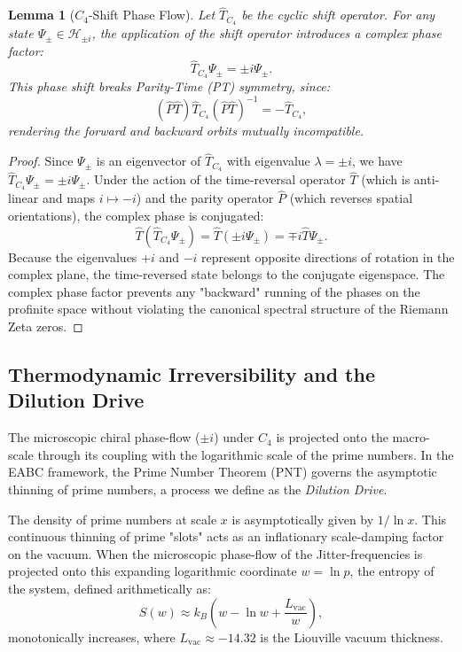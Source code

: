 \documentclass[11pt,a4paper]{article}
\newtheorem{lemma}[theorem]{Lemma}
\theoremstyle{definition}
\begin{document}
	\begin{lemma}[$C_4$-Shift Phase Flow]
		\label{lem:c4_shift}
		Let $\hat{T}_{C_4}$ be the cyclic shift operator. For any state $\Psi_{\pm} \in \mathcal{H}_{\pm i}$, the application of the shift operator introduces a complex phase factor:
		\begin{equation}
			\hat{T}_{C_4} \Psi_{\pm} = \pm i \Psi_{\pm}.
		\end{equation}
		This phase shift breaks Parity-Time (PT) symmetry, since:
		\begin{equation}
			(\hat{P}\hat{T}) \hat{T}_{C_4} (\hat{P}\hat{T})^{-1} = -\hat{T}_{C_4},
		\end{equation}
		rendering the forward and backward orbits mutually incompatible.
	\end{lemma}
	
	\begin{proof}
		Since $\Psi_{\pm}$ is an eigenvector of $\hat{T}_{C_4}$ with eigenvalue $\lambda = \pm i$, we have $\hat{T}_{C_4} \Psi_{\pm} = \pm i \Psi_{\pm}$. Under the action of the time-reversal operator $\hat{T}$ (which is anti-linear and maps $i \mapsto -i$) and the parity operator $\hat{P}$ (which reverses spatial orientations), the complex phase is conjugated:
		\begin{equation}
			\hat{T} (\hat{T}_{C_4} \Psi_{\pm}) = \hat{T} (\pm i \Psi_{\pm}) = \mp i \hat{T} \Psi_{\pm}.
		\end{equation}
		Because the eigenvalues $+i$ and $-i$ represent opposite directions of rotation in the complex plane, the time-reversed state belongs to the conjugate eigenspace. The complex phase factor prevents any "backward" running of the phases on the profinite space without violating the canonical spectral structure of the Riemann Zeta zeros.
	\end{proof}
	
	\subsection{Thermodynamic Irreversibility and the Dilution Drive}
	The microscopic chiral phase-flow ($\pm i$) under $C_4$ is projected onto the macro-scale through its coupling with the logarithmic scale of the prime numbers. In the EABC framework, the Prime Number Theorem (PNT) governs the asymptotic thinning of prime numbers, a process we define as the \emph{Dilution Drive}.
	
	The density of prime numbers at scale $x$ is asymptotically given by $1/\ln x$. This continuous thinning of prime "slots" acts as an inflationary scale-damping factor on the vacuum. When the microscopic phase-flow of the Jitter-frequencies is projected onto this expanding logarithmic coordinate $w = \ln p$, the entropy of the system, defined arithmetically as:
	\begin{equation}
		S(w) \approx k_B \left( w - \ln w + \frac{L_{\text{vac}}}{w} \right),
	\end{equation}
	monotonically increases, where $L_{\text{vac}} \approx -14.32$ is the Liouville vacuum thickness. 
	
\end{document}
